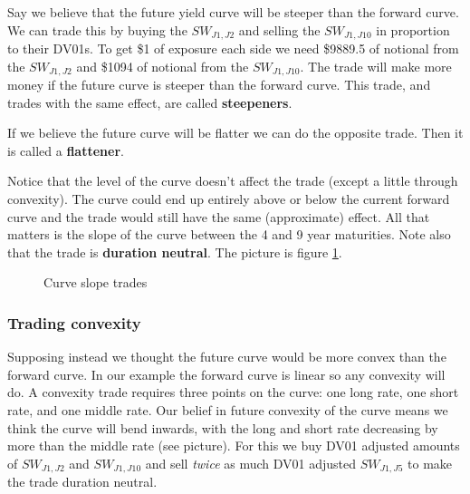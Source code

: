 Say we believe that the future yield curve will be steeper than the forward curve. We can trade this by buying the $SW_{J1,J2}$ and selling the $SW_{J1,J10}$ in proportion to their DV01s. To get \$1 of exposure each side we need \$9889.5 of notional from the $SW_{J1,J2}$ and \$1094 of notional from the $SW_{J1,J10}$. The trade will make more money if the future curve is steeper than the forward curve. This trade, and trades with the same effect, are called \textbf{steepeners}.

If we believe the future curve will be flatter we can do the opposite trade. Then it is called a \textbf{flattener}.

Notice that the level of the curve doesn't affect the trade (except a little through convexity). The curve could end up entirely above or below the current forward curve and the trade would still have the same (approximate) effect. All that matters is the slope of the curve between the 4 and 9 year maturities.  Note also that the trade is \textbf{duration neutral}. The picture is figure \ref{fig:slopes}.

\begin{figure}[ht]
\centering


\caption{Curve slope trades}
\label{fig:slopes}
\end{figure}

\subsubsection{Trading convexity}

Supposing instead we thought the future curve would be more convex than the forward curve. In our example the forward curve is linear so any convexity will do. A convexity trade requires three points on the curve: one long rate, one short rate, and one middle rate. Our belief in future convexity of the curve means we think the curve will bend inwards, with the long and short rate decreasing by more than the middle rate (see picture). For this we buy DV01 adjusted amounts of $SW_{J1,J2}$ and $SW_{J1,J10}$ and sell \textit{twice} as much DV01 adjusted $SW_{J1,J5}$ to make the trade duration neutral.

